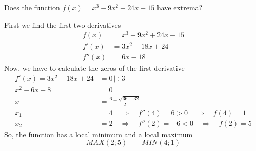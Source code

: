 \documentclass[12pt,eng]{skript_ogg}
\begin{document}
\begin{beispiel}
Does the function $f(x)=x^3-9x^2+24x-15$ have extrema?

First we find the first two derivatives
\begin{align*}
f(x)&=x^3-9x^2+24x-15\\
f'(x)&=3x^2-18x+24\\
f''(x)&=6x-18
\end{align*}
Now, we have to calculate the zeros of the first derivative
\begin{align*}
f'(x)=3x^2-18x+24&=0\,|\div3\\
x^2-6x+8&=0\\
x&=\frac{6\pm\sqrt{36-32}}{2}\\
x_1&=4\quad\Rightarrow\quad f''(4)=6>0\quad\Rightarrow\quad f(4)=1\\
x_2&=2\quad\Rightarrow\quad f''(2)=-6<0\quad\Rightarrow\quad f(2)=5
\end{align*}
So, the function has a local minimum and a local maximum
\[MAX(2;5)\qquad MIN(4;1)\]
\end{beispiel}
\end{document}
